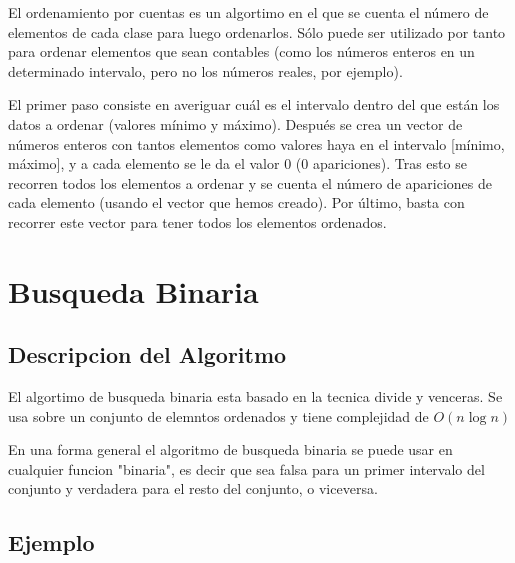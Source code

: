 El ordenamiento por cuentas es un algortimo en el que se cuenta el número de elementos de cada clase para luego ordenarlos. Sólo puede ser utilizado por tanto para ordenar elementos que sean contables (como los números enteros en un determinado intervalo, pero no los números reales, por ejemplo).

El primer paso consiste en averiguar cuál es el intervalo dentro del que están los datos a ordenar (valores mínimo y máximo). Después se crea un vector de números enteros con tantos elementos como valores haya en el intervalo [mínimo, máximo], y a cada elemento se le da el valor 0 (0 apariciones). Tras esto se recorren todos los elementos a ordenar y se cuenta el número de apariciones de cada elemento (usando el vector que hemos creado). Por último, basta con recorrer este vector para tener todos los elementos ordenados.

\section{Busqueda Binaria}

\subsection{Descripcion del Algoritmo}

El algortimo de busqueda binaria esta basado en la tecnica divide y venceras. Se usa sobre un conjunto de elemntos ordenados y tiene complejidad de $ O(n \log n) $

En una forma general el algoritmo de busqueda binaria se puede usar en cualquier funcion "binaria", es decir que sea falsa para un primer intervalo del conjunto y verdadera para el resto del conjunto, o viceversa.

\subsection{Ejemplo}
